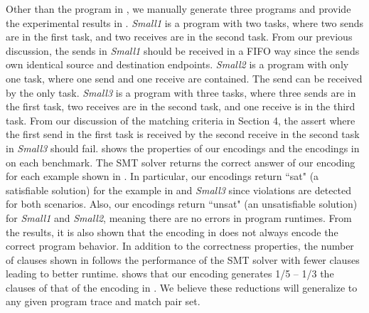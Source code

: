 Other than the program in , we manually generate three programs and provide the experimental results in . \textit{Small1} is a program with two tasks, where two sends are in the first task, and two receives are in the second task. From our previous discussion, the sends in \textit{Small1} should be received in a FIFO way since the sends own identical source and destination endpoints. \textit{Small2} is a program with only one task, where one send and one receive are contained. The send can be received by the only task. \textit{Small3} is a program with three tasks, where three sends are in the first task, two receives are in the second task, and one receive is in the third task. From our discussion of the matching criteria in Section 4, the assert where the first send in the first task is received by the second receive in the second task in \textit{Small3} should fail.  shows the properties of our encodings and the encodings in \cite{elwakil:padtad10} on each benchmark. The SMT solver returns the correct answer of our encoding for each example shown in . In particular, our encodings return ``sat" (a satisfiable solution) for the example in  and \textit{Small3} since violations are detected for both scenarios. Also, our encodings return ``unsat" (an unsatisfiable solution) for \textit{Small1} and \textit{Small2}, meaning there are no errors in program runtimes. From the results, it is also shown that the encoding in \cite{elwakil:padtad10} does not always encode the correct program behavior. In addition to the correctness properties, the number of clauses shown in  follows the performance of the SMT solver with fewer clauses leading to better runtime.  shows that our encoding generates  1/5 -- 1/3  the clauses of that of the encoding in \cite{elwakil:padtad10}. We believe these reductions will generalize to any given program trace and match pair set.

